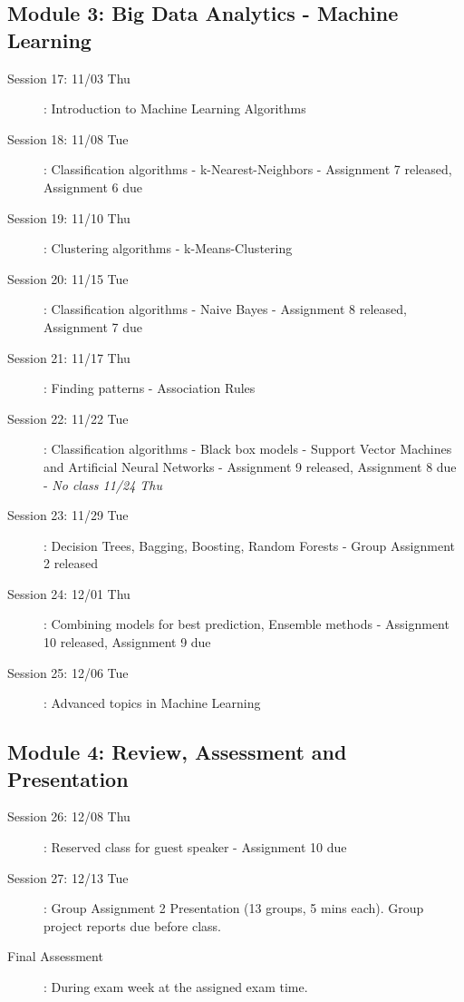 \documentclass[10pt, letterpaper, twoside]{memoir}\usepackage{knitr}
\begin{document}
\subsection{Module 3: Big Data Analytics - Machine Learning}
\begin{description}
\item [Session 17: 11/03 Thu]: Introduction to Machine Learning Algorithms


\item [Session 18: 11/08 Tue]: Classification algorithms - k-Nearest-Neighbors
    - Assignment 7 released, Assignment 6 due

\item [Session 19: 11/10 Thu]: Clustering algorithms - k-Means-Clustering
    

\item [Session 20: 11/15 Tue]: Classification algorithms - Naive Bayes
    - Assignment 8 released, Assignment 7 due

\item [Session 21: 11/17 Thu]: Finding patterns - Association Rules


\item [Session 22: 11/22 Tue]: Classification algorithms - Black box models - Support Vector Machines and Artificial Neural Networks
    - Assignment 9 released, Assignment 8 due
    - \emph{No class 11/24 Thu}
    
\item [Session 23: 11/29 Tue]: Decision Trees, Bagging, Boosting, Random Forests
    - Group Assignment 2 released

\item [Session 24: 12/01 Thu]: Combining models for best prediction, Ensemble methods 
    - Assignment 10 released, Assignment 9 due 

\item [Session 25: 12/06 Tue]: Advanced topics in Machine Learning
\end{description}

\subsection{Module 4: Review, Assessment and Presentation}
\begin{description}
\item [Session 26: 12/08 Thu]: Reserved class for guest speaker
    - Assignment 10 due

\item [Session 27: 12/13 Tue]: Group Assignment 2 Presentation (13 groups, 5 mins each). Group project reports due before class.

\item [Final Assessment]: During exam week at the assigned exam time.
\end{description}
\end{document}
